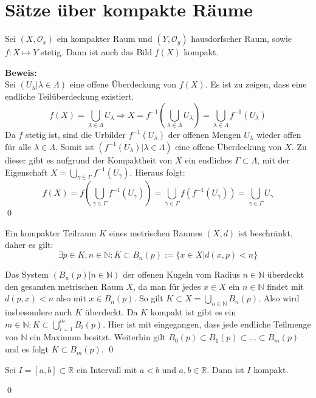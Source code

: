 \chapter{Sätze über kompakte Räume}

\begin{Satz}
Sei \( (X, \mathcal{O}_x) \) ein kompakter Raum und \((Y, \mathcal{O}_y)\) hausdorfscher Raum, sowie \(f: X \mapsto Y\) stetig.
Dann ist auch das Bild \( f(X) \) kompakt.
\end{Satz}
%
\textbf{Beweis:}
	\\
	Sei \( (U_{\lambda} | \lambda \in \Lambda) \) eine offene Überdeckung von \(f(X)\). Es ist zu zeigen,
	dass eine endliche Teilüberdeckung existiert. 
	\[ f(X) = \bigcup_{\lambda \in \Lambda} U_{\lambda} \Rightarrow X = 
  	 f^{-1}(\bigcup_{\lambda \in \Lambda} U_{\lambda}) = 
		 \bigcup_{\lambda \in \Lambda} f^{-1}(U_{\lambda}) \]
	Da \(f\) stetig ist, sind die Urbilder \( f^{-1}(U_{\lambda}) \) der offenen Mengen \(U_{\lambda}\) wieder offen für 
	alle \(\lambda \in \Lambda\). Somit ist \( ( f^{-1}(U_{\lambda}) | \lambda \in \Lambda ) \) eine offene Überdeckung
	von \(X\). Zu dieser gibt es aufgrund der Kompaktheit von \(X\) ein endliches \( \Gamma \subset \Lambda \), mit 
	der Eigenschaft \( X = \bigcup_{\gamma \in \Gamma} f^{-1}(U_{\gamma}) \). Hieraus folgt:
	\[ f(X) = f(\bigcup_{\gamma \in \Gamma} f^{-1}(U_{\gamma})) = 
  	 \bigcup_{\gamma \in \Gamma} f(f^{-1}(U_{\gamma})) = 
	   \bigcup_{\gamma \in \Gamma} U_{\gamma} \]
\qed

\begin{Satz}
	Ein kompakter Teilraum \(K\) eines metrischen Raumes \( (X, d) \) ist beschränkt, daher es gilt:
	\[ \exists p \in K, n \in \mathbb{N} : K \subset B_n(p) := \{ x \in X | d(x,p) < n \} \]
\end{Satz}
Das System \( (B_{n}(p) | n \in \mathbb{N}) \) der offenen Kugeln vom Radius \(n \in \mathbb{N}\) überdeckt 
den gesamten metrischen Raum \(X\), da man für jedes \(x \in X\) ein \(n \in \mathbb{N}\) findet mit \(d(p,x) < n\)
also mit \(x \in B_{n}(p)\).
So gilt \(K \subset X = \bigcup_{n \in \mathbb{N}} B_{n}(p)\). 
Also wird insbesondere auch \(K\) überdeckt. 
Da \(K\) kompakt ist gibt es ein \(m \in \mathbb{N} : K \subset \bigcup_{i=1}^{m} B_{i}(p) \). Hier ist
mit eingegangen, dass jede endliche Teilmenge von \(\mathbb{N}\) ein Maximum besitzt.
Weiterhin gilt \( B_0(p) \subset B_1(p) \subset \dots \subset B_m(p) \) und es folgt \(K \subset B_m(p)\).
\qed

\begin{Satz}
	Sei \(I = [ a , b ] \subset \mathbb{R}\) ein Intervall mit \(a<b\) und \(a,b \in \mathbb{R}\). Dann 
	ist \(I\) kompakt.
\end{Satz}
\qed

